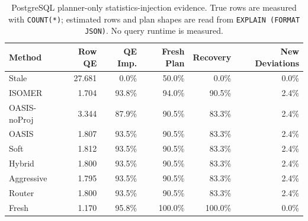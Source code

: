 \begin{table}[t]
  \centering
  \small
  \caption{PostgreSQL planner-only statistics-injection evidence. True rows are measured with \texttt{COUNT(*)}; estimated rows and plan shapes are read from \texttt{EXPLAIN (FORMAT JSON)}. No query runtime is measured.}
  \label{tab:postgres_planner_stats_injection}
  \setlength{\tabcolsep}{4pt}
  \begin{tabular}{lrrrrr}
    \toprule
    Method & Row QE & QE Imp. & Fresh Plan & Recovery & New Deviations \\
    \midrule
    Stale & 27.681 & 0.0\% & 50.0\% & 0.0\% & 0.0\% \\
    ISOMER & 1.704 & 93.8\% & 94.0\% & 90.5\% & 2.4\% \\
    OASIS-noProj & 3.344 & 87.9\% & 90.5\% & 83.3\% & 2.4\% \\
    OASIS & 1.807 & 93.5\% & 90.5\% & 83.3\% & 2.4\% \\
    Soft & 1.812 & 93.5\% & 90.5\% & 83.3\% & 2.4\% \\
    Hybrid & 1.800 & 93.5\% & 90.5\% & 83.3\% & 2.4\% \\
    Aggressive & 1.795 & 93.5\% & 90.5\% & 83.3\% & 2.4\% \\
    Router & 1.800 & 93.5\% & 90.5\% & 83.3\% & 2.4\% \\
    Fresh & 1.170 & 95.8\% & 100.0\% & 100.0\% & 0.0\% \\
    \bottomrule
  \end{tabular}
\end{table}
